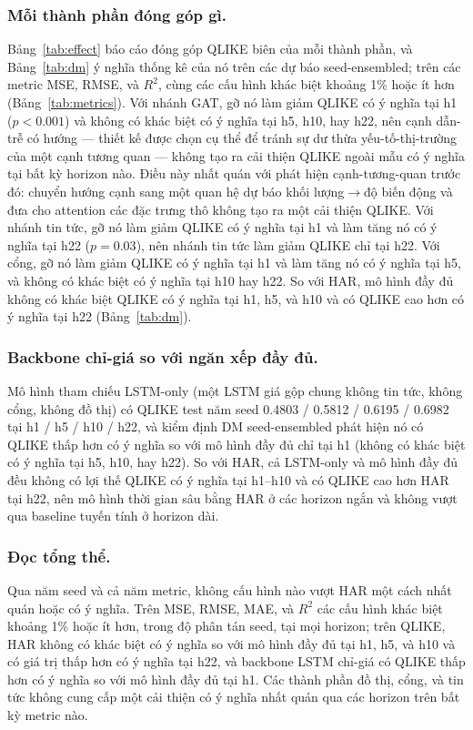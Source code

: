 \documentclass[runningheads]{llncs}
\begin{document}
\subsubsection{Mỗi thành phần đóng góp gì.}
Bảng~\ref{tab:effect} báo cáo đóng góp QLIKE biên của mỗi thành phần, và Bảng~\ref{tab:dm} ý nghĩa thống
kê của nó trên các dự báo seed-ensembled; trên các metric MSE, RMSE, và $R^2$, cùng các cấu hình khác
biệt khoảng 1\% hoặc ít hơn (Bảng~\ref{tab:metrics}). Với nhánh GAT, gỡ nó làm giảm QLIKE có ý nghĩa tại
h1 ($p<0.001$) và không có khác biệt có ý nghĩa tại h5, h10, hay h22, nên cạnh dẫn-trễ có hướng --- thiết
kế được chọn cụ thể để tránh sự dư thừa yếu-tố-thị-trường của một cạnh tương quan --- không tạo ra cải
thiện QLIKE ngoài mẫu có ý nghĩa tại bất kỳ horizon nào. Điều này nhất quán với phát hiện cạnh-tương-quan
trước đó: chuyển hướng cạnh sang một quan hệ dự báo khối lượng$\to$độ biến động và đưa cho attention các
đặc trưng thô không tạo ra một cải thiện QLIKE. Với nhánh tin tức, gỡ nó làm giảm QLIKE có ý nghĩa tại h1
và làm tăng nó có ý nghĩa tại h22 ($p=0.03$), nên nhánh tin tức làm giảm QLIKE chỉ tại h22. Với cổng, gỡ
nó làm giảm QLIKE có ý nghĩa tại h1 và làm tăng nó có ý nghĩa tại h5, và không có khác biệt có ý nghĩa
tại h10 hay h22. So với HAR, mô hình đầy đủ không có khác biệt QLIKE có ý nghĩa tại h1, h5, và h10 và có
QLIKE cao hơn có ý nghĩa tại h22 (Bảng~\ref{tab:dm}).

\subsubsection{Backbone chỉ-giá so với ngăn xếp đầy đủ.}
Mô hình tham chiếu LSTM-only (một LSTM giá gộp chung không tin tức, không cổng, không đồ thị) có QLIKE
test năm seed 0.4803 / 0.5812 / 0.6195 / 0.6982 tại h1 / h5 / h10 / h22, và kiểm định DM seed-ensembled
phát hiện nó có QLIKE thấp hơn có ý nghĩa so với mô hình đầy đủ chỉ tại h1 (không có khác biệt có ý nghĩa
tại h5, h10, hay h22). So với HAR, cả LSTM-only và mô hình đầy đủ đều không có lợi thế QLIKE có ý nghĩa
tại h1--h10 và có QLIKE cao hơn HAR tại h22, nên mô hình thời gian sâu bằng HAR ở các horizon ngắn và
không vượt qua baseline tuyến tính ở horizon dài.

\subsubsection{Đọc tổng thể.}
Qua năm seed và cả năm metric, không cấu hình nào vượt HAR một cách nhất quán hoặc có ý nghĩa. Trên MSE,
RMSE, MAE, và $R^2$ các cấu hình khác biệt khoảng 1\% hoặc ít hơn, trong độ phân tán seed, tại mọi
horizon; trên QLIKE, HAR không có khác biệt có ý nghĩa so với mô hình đầy đủ tại h1, h5, và h10 và có giá
trị thấp hơn có ý nghĩa tại h22, và backbone LSTM chỉ-giá có QLIKE thấp hơn có ý nghĩa so với mô hình đầy
đủ tại h1. Các thành phần đồ thị, cổng, và tin tức không cung cấp một cải thiện có ý nghĩa nhất quán qua
các horizon trên bất kỳ metric nào.
\end{document}
